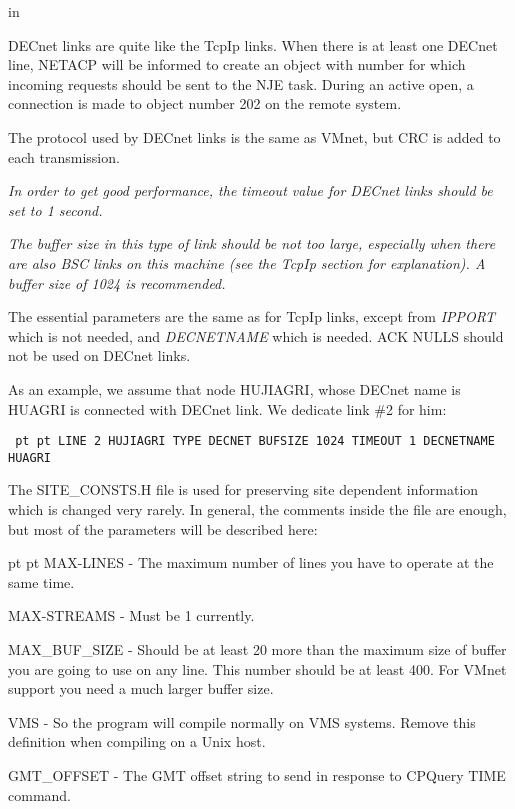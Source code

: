  in

DECnet  links  are quite like the TcpIp links. When there is at least
one DECnet line, NETACP will be informed to create an object with number
{} for which
incoming requests should be sent to the NJE task. During
an active open, a connection is made to object number 202 on the  remote
system.

The  protocol  used  by DECnet links is the same as VMnet, but CRC is
added to each transmission.

{\sl In order to get good performance, the timeout value for DECnet  links
should be set to 1 second.}

{\sl The  buffer  size  in  this  type  of  link  should be not too large,
especially when there are also BSC links on this machine (see the  TcpIp
section for explanation). A buffer size of 1024 is recommended.}

The essential parameters are the same as for TcpIp links, except from
{\sl IPPORT} which is not needed, and {\sl DECNETNAME} which is needed.
{\ncrBold ACK NULLS should not be used on DECnet links.}

As  an  example,  we  assume that node HUJIAGRI, whose DECnet name is
HUAGRI is connected with DECnet link. We dedicate link \#2 for him:

{\obeylines\obeyspaces\tt{} pt  pt
LINE  2  HUJIAGRI
TYPE  DECNET
BUFSIZE  1024
TIMEOUT  1
DECNETNAME  HUAGRI
}

\vfill\eject


The  SITE\_CONSTS.H  file  is  used  for  preserving  site   dependent
information  which  is  changed  very  rarely.  In general, the comments
inside the file are enough, but most of the parameters will be described
here:

{ pt  pt
{\ncrBold MAX-LINES}  - The maximum number of lines you have to operate at
the same time.

{\ncrBold MAX-STREAMS} - Must be 1 currently.

{\ncrBold MAX\_BUF\_SIZE} - Should be at least 20 more than the maximum size of
buffer  you are going to use on any line. This number should be at least
400. For VMnet support you need a much larger buffer size.

{\ncrBold VMS} - So the program will compile normally on VMS systems.
Remove this
definition when compiling on a Unix host.

{\ncrBold GMT\_OFFSET} -  The GMT offset string to send in response to
CPQuery TIME command.
}

